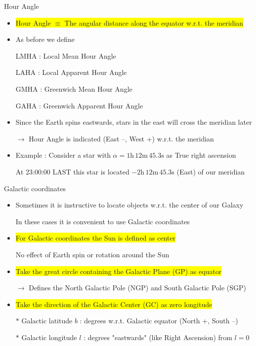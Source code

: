 \Tr
\onecolumn
\begin{center}
{\red Hour Angle}
\end{center}
%
\begin{itemize}
\item \colorbox{yellow}{Hour Angle $\equiv$ The angular distance along the equator w.r.t. the meridian}
\item As before we define
\item[] {\red LMHA : Local Mean Hour Angle}
\item[] {\red LAHA : Local Apparent Hour Angle}
\item[] {\red GMHA : Greenwich Mean Hour Angle}
\item[] {\red GAHA : Greenwich Apparent Hour Angle}
\item Since the Earth spins eastwards, stars in the east will cross the meridian later
\item[] $\rightarrow$ {\blue Hour Angle is indicated (East --, West +) w.r.t. the meridian}
\item Example : Consider a star with $\alpha=1\text{h}\,12\text{m}\,45.3\text{s}$ as True right ascension
\item[] At 23:00:00 LAST this star is located $-2\text{h}\,12\text{m}\,45.3\text{s}$ (East) of our meridian
\end{itemize}

\Tr
\onecolumn
\begin{center}
{\red Galactic coordinates}
\end{center}
%
\begin{itemize}
\item Sometimes it is instructive to locate objects w.r.t. the center of our Galaxy
\item[] In these cases it is convenient to use Galactic coordinates
\item \colorbox{yellow}{For Galactic coordinates the Sun is defined as center}
\item[] No effect of Earth spin or rotation around the Sun
\item \colorbox{yellow}{Take the great circle containing the Galactic Plane (GP) as equator}
\item[] $\rightarrow$ Defines the {\blue North Galactic Pole (NGP)} and {\blue South Galactic Pole (SGP)}
\item \colorbox{yellow}{Take the direction of the Galactic Center (GC) as zero longitude}
\item[$\ast$] {\blue Galactic latitude $b$} : degrees w.r.t. Galactic equator (North +, South --)
\item[$\ast$] {\blue Galactic longitude $l$} : degrees "eastwards" (like Right Ascension) from $l=0$
\end{itemize}

